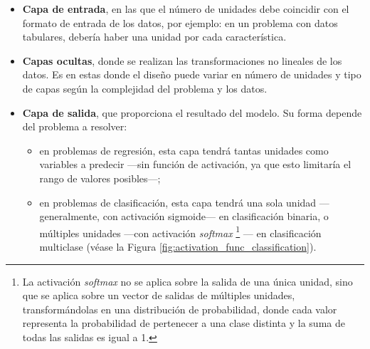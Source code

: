 \begin{itemize}

    \item \textbf{Capa de entrada}, en las que el número de unidades debe coincidir con el formato de entrada de los datos, por ejemplo: en un problema con datos tabulares, debería haber una unidad por cada característica.
    
    \item \textbf{Capas ocultas}, donde se realizan las transformaciones no lineales de los datos. Es en estas donde el diseño puede variar en número de unidades y tipo de capas según la complejidad del problema y los datos.
    
    \item \textbf{Capa de salida}, que proporciona el resultado del modelo. Su forma depende del problema a 
    resolver: 
    
    \begin{itemize}
        
        \item en problemas de regresión, esta capa tendrá tantas unidades como variables a predecir ---sin 
        función de activación, ya que esto limitaría el rango de valores posibles---;
        
        \item en problemas de clasificación, esta capa tendrá una sola unidad ---generalmente, con activación 
        sigmoide--- en clasificación binaria, o múltiples unidades ---con activación 
        \textit{softmax}%
        \footnote{
            La activación \textit{softmax} no se aplica sobre la salida de una única unidad, sino que se 
            aplica sobre un vector de salidas de múltiples unidades, transformándolas en una distribución de 
            probabilidad, donde cada valor representa la probabilidad de pertenecer a una clase distinta y la 
            suma de todas las salidas es igual a 1.
        }
        --- en clasificación multiclase (véase la Figura \ref{fig:activation_func_classification}).
    \end{itemize}

\end{itemize}

